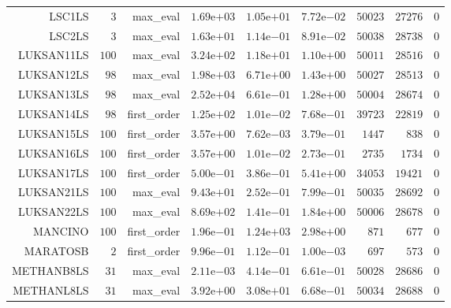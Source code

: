 \begin{longtable}{rrrrrrrrr}
LSC1LS & \(     3\) & max\_eval & \( 1.69\)e\(+03\) & \( 1.05\)e\(+01\) & \( 7.72\)e\(-02\) & \( 50023\) & \( 27276\) & \(     0\) \\
LSC2LS & \(     3\) & max\_eval & \( 1.63\)e\(+01\) & \( 1.14\)e\(-01\) & \( 8.91\)e\(-02\) & \( 50038\) & \( 28738\) & \(     0\) \\
LUKSAN11LS & \(   100\) & max\_eval & \( 3.24\)e\(+02\) & \( 1.18\)e\(+01\) & \( 1.10\)e\(+00\) & \( 50011\) & \( 28516\) & \(     0\) \\
LUKSAN12LS & \(    98\) & max\_eval & \( 1.98\)e\(+03\) & \( 6.71\)e\(+00\) & \( 1.43\)e\(+00\) & \( 50027\) & \( 28513\) & \(     0\) \\
LUKSAN13LS & \(    98\) & max\_eval & \( 2.52\)e\(+04\) & \( 6.61\)e\(-01\) & \( 1.28\)e\(+00\) & \( 50004\) & \( 28674\) & \(     0\) \\
LUKSAN14LS & \(    98\) & first\_order & \( 1.25\)e\(+02\) & \( 1.01\)e\(-02\) & \( 7.68\)e\(-01\) & \( 39723\) & \( 22819\) & \(     0\) \\
LUKSAN15LS & \(   100\) & first\_order & \( 3.57\)e\(+00\) & \( 7.62\)e\(-03\) & \( 3.79\)e\(-01\) & \(  1447\) & \(   838\) & \(     0\) \\
LUKSAN16LS & \(   100\) & first\_order & \( 3.57\)e\(+00\) & \( 1.01\)e\(-02\) & \( 2.73\)e\(-01\) & \(  2735\) & \(  1734\) & \(     0\) \\
LUKSAN17LS & \(   100\) & first\_order & \( 5.00\)e\(-01\) & \( 3.86\)e\(-01\) & \( 5.41\)e\(+00\) & \( 34053\) & \( 19421\) & \(     0\) \\
LUKSAN21LS & \(   100\) & max\_eval & \( 9.43\)e\(+01\) & \( 2.52\)e\(-01\) & \( 7.99\)e\(-01\) & \( 50035\) & \( 28692\) & \(     0\) \\
LUKSAN22LS & \(   100\) & max\_eval & \( 8.69\)e\(+02\) & \( 1.41\)e\(-01\) & \( 1.84\)e\(+00\) & \( 50006\) & \( 28678\) & \(     0\) \\
MANCINO & \(   100\) & first\_order & \( 1.96\)e\(-01\) & \( 1.24\)e\(+03\) & \( 2.98\)e\(+00\) & \(   871\) & \(   677\) & \(     0\) \\
MARATOSB & \(     2\) & first\_order & \( 9.96\)e\(-01\) & \( 1.12\)e\(-01\) & \( 1.00\)e\(-03\) & \(   697\) & \(   573\) & \(     0\) \\
METHANB8LS & \(    31\) & max\_eval & \( 2.11\)e\(-03\) & \( 4.14\)e\(-01\) & \( 6.61\)e\(-01\) & \( 50028\) & \( 28686\) & \(     0\) \\
METHANL8LS & \(    31\) & max\_eval & \( 3.92\)e\(+00\) & \( 3.08\)e\(+01\) & \( 6.68\)e\(-01\) & \( 50034\) & \( 28688\) & \(     0\) \\

\end{longtable}

